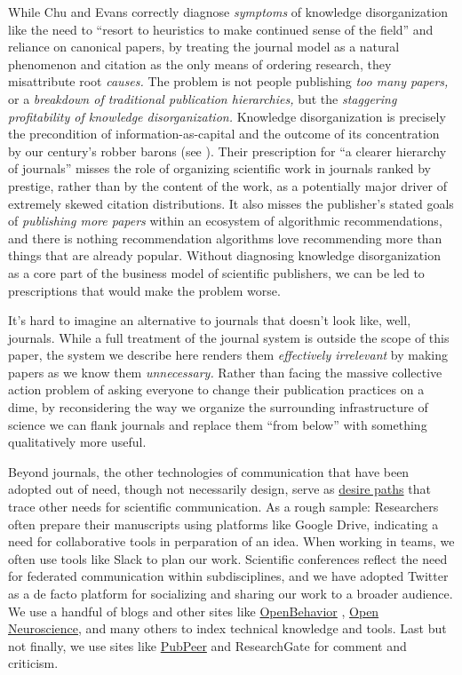 While Chu and Evans \citep{chuSlowedCanonicalProgress2021} 
correctly diagnose \emph{symptoms} of knowledge disorganization like the
need to ``resort to heuristics to make continued sense of the field''
and reliance on canonical papers, by treating the journal model as a
natural phenomenon and citation as the only means of ordering research,
they misattribute root \emph{causes.} The problem is not people
publishing \emph{too many papers,} or a \emph{breakdown of traditional
publication hierarchies,} but the \emph{staggering profitability of
knowledge disorganization.} Knowledge disorganization is precisely the
precondition of information-as-capital and the outcome of its
concentration by our century's robber barons (see \citep{ellenwoodInformationHasValue2020} ). Their prescription for ``a
clearer hierarchy of journals'' misses the role of organizing scientific
work in journals ranked by prestige, rather than by the content of the
work, as a potentially major driver of extremely skewed citation
distributions. It also misses the publisher's stated goals of
\emph{publishing more papers} within an ecosystem of algorithmic
recommendations, and there is nothing recommendation algorithms love
recommending more than things that are already popular. Without
diagnosing knowledge disorganization as a core part of the business
model of scientific publishers, we can be led to prescriptions that
would make the problem worse.

It's hard to imagine an alternative to journals that doesn't look like,
well, journals. While a full treatment of the journal system is outside
the scope of this paper, the system we describe here renders them
\emph{effectively irrelevant} by making papers as we know them
\emph{unnecessary.} Rather than facing the massive collective action
problem of asking everyone to change their publication practices on a
dime, by reconsidering the way we organize the surrounding
infrastructure of science we can flank journals and replace them ``from
below'' with something qualitatively more useful.

Beyond journals, the other technologies of communication that have been
adopted out of need, though not necessarily design, serve as
\href{https://en.wikipedia.org/wiki/Desire_path}{desire paths} that
trace other needs for scientific communication. As a rough sample:
Researchers often prepare their manuscripts using platforms like Google
Drive, indicating a need for collaborative tools in perparation of an
idea. When working in teams, we often use tools like Slack to plan our
work. Scientific conferences reflect the need for federated
communication within subdisciplines, and we have adopted Twitter as a de
facto platform for socializing and sharing our work to a broader
audience. We use a handful of blogs and other sites like
\href{https://edspace.american.edu/openbehavior/}{OpenBehavior} \citep{whiteFutureOpenOpenSource2019} ,
\href{https://open-neuroscience.com/}{Open Neuroscience}, and many
others to index technical knowledge and tools. Last but not finally, we
use sites like \href{https://pubpeer.com}{PubPeer} and ResearchGate for
comment and criticism.

